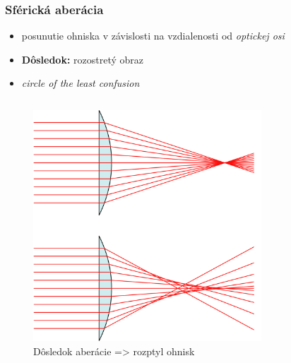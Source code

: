 \documentclass[10pt,xcolor=pdflatex]{beamer}
\begin{document}
\begin{frame}\frametitle{Sférická aberácia}
    \begin{itemize}
        \item posunutie ohniska v závislosti na vzdialenosti od \textit{optickej osi}
        \item \textbf{Dôsledok:} rozostretý obraz 
        \item \textit{circle of the least confusion}
    \end{itemize}

    \begin{columns}
    \begin{figure}
        \includegraphics[scale=0.1]{img/sphericalAberrationWikipedia.png}
        \caption{Dôsledok aberácie => rozptyl ohnisk}
    \end{figure}
    \begin{figure}

\end{figure}
\end{columns}
\end{frame}
\end{document}

